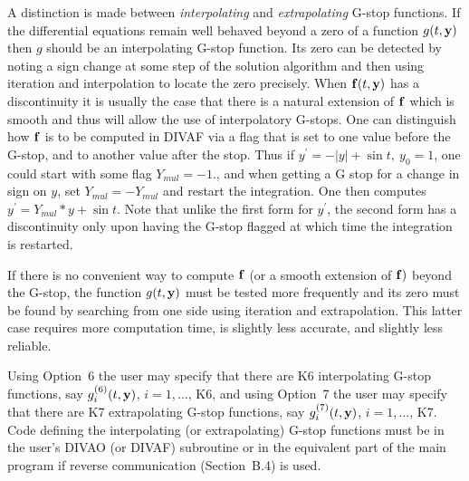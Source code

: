\documentclass[twoside]{MATH77}
\begin{document}
A distinction is made between {\em interpolating} and {\em
extrapolating} G-stop functions. If the differential equations remain
well behaved beyond a zero of a function $g(t,{\bf y})$ then $g$
should be an interpolating G-stop function. Its zero can be detected
by noting a sign change at some step of the solution algorithm and
then using iteration and interpolation to locate the zero precisely.
When ${\bf f}(t,{\bf y})$ has a discontinuity it is usually the case
that there is a natural extension of ${\bf f}$ which is smooth and
thus will allow the use of interpolatory G-stops. One can distinguish
how ${\bf f}$ is to be computed in DIVAF via a flag that is set to
one value before the G-stop, and to another value after the stop.
Thus if $y^{\prime} = -|y| + \sin t,\ y_0 = 1$, one could start with
some flag $Y_{mul} = -1.$, and when getting a G stop for a change in
sign on $y$, set $Y_{mul} = -Y_{mul}$ and restart the integration.  One
then computes $y^{\prime} = Y_{mul} * y + \sin t.$  Note that unlike the
first form for $y^{\prime}$, the second form has a discontinuity only
upon having the G-stop flagged at which time the integration is
restarted.

If there is no convenient way to compute ${\bf f}$ (or a smooth extension of
${\bf f})$ beyond the G-stop, the function $g(t,{\bf y})$ must be tested
more frequently and its zero must be found by searching from one side using
iteration and extrapolation. This latter case requires more computation
time, is slightly less accurate, and slightly less reliable.

Using Option~6 the user may specify that there are K6 interpolating G-stop
functions, say $g_i^{(6)}(t,{\bf y})$, $i=1,...$, K6, and using Option~7 the
user may specify that there are K7 extrapolating G-stop functions, say $%
g_i^{(7)}(t,{\bf y})$, $i=1,...$, K7. Code defining the interpolating
(or extrapolating) G-stop functions must be in the user's DIVAO
(or DIVAF) subroutine or in the equivalent part of the main
program if reverse communication (Section\ B.4) is used.
\end{document}
